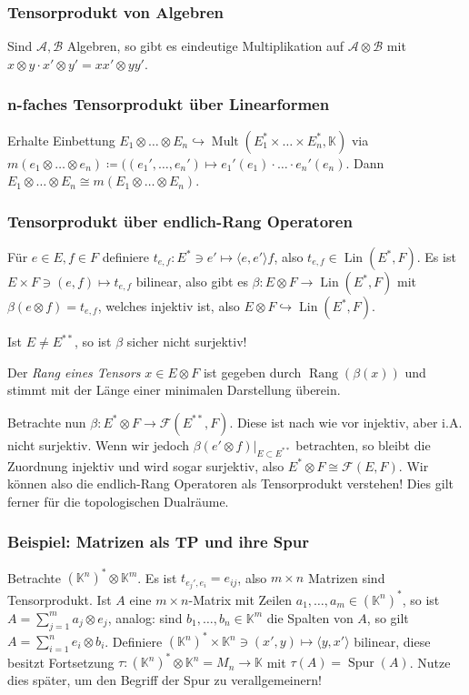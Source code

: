 \documentclass[11pt,a4paper]{scrartcl}
\newcommand{\K}{\mathbb{K}} %
\newcommand{\A}{\mathcal{A}}
\newcommand{\B}{\mathcal{B}}
\newcommand{\F}{\mathcal{F}}
\theoremstyle{plain}
\theoremstyle{definition}
\theoremstyle{remark}
\DeclareMathOperator{\Lin}{Lin}
\DeclareMathOperator{\Mult}{Mult}
\DeclareMathOperator{\Rang}{Rang}
\DeclareMathOperator{\Spur}{Spur}
\begin{document}
\subsubsection{Tensorprodukt von Algebren}

Sind $\A,\B$ Algebren, so gibt es eindeutige Multiplikation auf $\A\otimes \B$ mit $x\otimes y \cdot x'\otimes y' = xx'\otimes yy'$.

\subsubsection{n-faches Tensorprodukt über Linearformen}

Erhalte Einbettung $E_1\otimes \dots \otimes E_n \hookrightarrow \Mult(E_1^*\times \dots \times E_n^*, \K)$ via $m(e_1\otimes \dots \otimes e_n) \coloneqq ((e_1', \dots, e_n')\mapsto e_1'(e_1)\cdot \dots \cdot e_n'(e_n)$. Dann $E_1\otimes \dots \otimes E_n \cong m(E_1\otimes \dots \otimes E_n)$.

\subsubsection{Tensorprodukt über endlich-Rang Operatoren}

Für $e\in E, f\in F$ definiere $t_{e,f}: E^*\ni e' \mapsto \langle e, e' \rangle f$, also $t_{e,f}\in \Lin(E^*,F)$. Es ist $E\times F \ni (e,f) \mapsto t_{e,f}$ bilinear, also gibt es $\beta: E\otimes F \to \Lin(E^*,F)$ mit $\beta(e\otimes f) = t_{e,f}$, welches injektiv ist, also $E\otimes F \hookrightarrow \Lin(E^*,F)$.

Ist $E\neq E^{**}$, so ist $\beta$ sicher nicht surjektiv!

Der \emph{Rang eines Tensors} $x\in E\otimes F$ ist gegeben durch $\Rang(\beta(x))$ und stimmt mit der Länge einer minimalen Darstellung überein.

Betrachte nun $\beta: E^*\otimes F \to \F(E^{**},F)$. Diese ist nach wie vor injektiv, aber i.A. nicht surjektiv. Wenn wir jedoch $\beta(e'\otimes f)|_{E\subset E^{**}}$ betrachten, so bleibt die Zuordnung injektiv und wird sogar surjektiv, also $E^*\otimes F \cong \F(E,F)$. Wir können also die endlich-Rang Operatoren als Tensorprodukt verstehen! Dies gilt ferner für die topologischen Dualräume.

\subsubsection{Beispiel: Matrizen als TP und ihre Spur}

Betrachte $(\K^n)^* \otimes \K^m$. Es ist $t_{e_j',e_i}=e_{ij}$, also $m\times n$ Matrizen sind Tensorprodukt. Ist $A$ eine $m\times n$-Matrix mit Zeilen $a_1,\dots,a_m \in (\K^n)^*$, so ist $A=\sum_{j=1}^m a_j \otimes e_j$, analog: sind $b_1,\dots,b_n \in \K^m$ die Spalten von $A$, so gilt $A=\sum_{i=1}^n e_i \otimes b_i$. Definiere $(\K^n)^* \times \K^n \ni (x',y)\mapsto \langle y, x' \rangle$ bilinear, diese besitzt Fortsetzung $\tau: (\K^n)^*\otimes \K^n = M_n \to \K$ mit $\tau(A)=\Spur(A)$. Nutze dies später, um den Begriff der Spur zu verallgemeinern!
\end{document}
